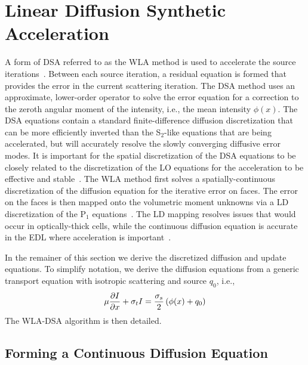 \section{Linear Diffusion Synthetic Acceleration}

A form of DSA referred to as the WLA method is used to accelerate the source
iterations~\cite{wla,wla_thesis}. 
Between each source iteration, a residual equation is formed that provides 
the error in the current scattering iteration. The DSA method uses an approximate,
lower-order operator to solve the error equation for a correction to the zeroth angular moment of the
intensity, i.e., the mean intensity $\phi(x)$.  The DSA equations contain a standard
finite-difference diffusion discretization that can be more efficiently
inverted than the S$_2$-like equations that are being accelerated, but will accurately resolve the
slowly converging diffusive error modes.  It is important for the spatial discretization of the DSA
equations to be closely related to the discretization of the LO equations for the
acceleration to be effective and stable~\cite{adams_dsa}.  The WLA method first solves a spatially-continuous
discretization of the diffusion equation
for the iterative error on faces.  The error on the faces is then mapped onto the
volumetric moment unknowns via a LD discretization of the P$_1$ equations~\cite{wla}.
The LD mapping resolves issues that would occur in optically-thick cells, while the
continuous diffusion equation is accurate in the EDL where acceleration is important~\cite{adams_dsa}.

In the remainer of this section we derive the discretized diffusion and update equations.  To simplify notation, we
derive the diffusion equations from a generic transport equation with isotropic scattering
and source $q_0$, i.e.,
\begin{equation}\label{eq:ss_trans}
    \mu \frac{\partial I}{\partial x} + \sigma_t I = \frac{\sigma_s}{2}\left( \phi(x) + q_0\right)
\end{equation}
The WLA-DSA algorithm is then detailed.

\subsection{Forming a Continuous Diffusion Equation}

